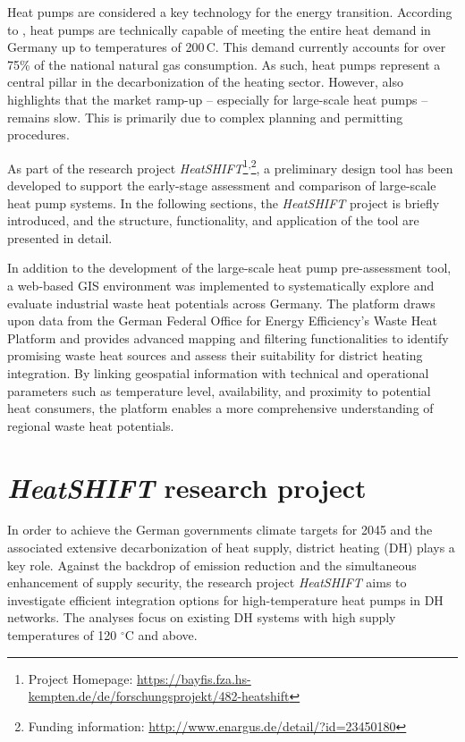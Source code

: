 \documentclass[letterpaper,11pt]{article}
\begin{document}
Heat pumps are considered a key technology for the energy transition. According to \cite{agorarollout}, heat pumps are technically capable of meeting the entire heat demand in Germany up to temperatures of 200\,\textdegree{}C. This demand currently accounts for over 75\% of the national natural gas consumption. As such, heat pumps represent a central pillar in the decarbonization of the heating sector. However, \cite{agorarollout} also highlights that the market ramp-up -- especially for large-scale heat pumps -- remains slow. This is primarily due to complex planning and permitting procedures.

As part of the research project \textit{HeatSHIFT}\footnote{Project Homepage: \url{https://bayfis.fza.hs-kempten.de/de/forschungsprojekt/482-heatshift}}\textsuperscript{,}\footnote{Funding information: \url{http://www.enargus.de/detail/?id=23450180}}, a preliminary design tool has been developed to support the early-stage assessment and comparison of large-scale heat pump systems. In the following sections, the \textit{HeatSHIFT} project is briefly introduced, and the structure, functionality, and application of the tool are presented in detail.

In addition to the development of the large-scale heat pump pre-assessment tool, a web-based GIS environment was implemented to systematically explore and evaluate industrial waste heat potentials across Germany. The platform draws upon data from the German Federal Office for Energy Efficiency’s Waste Heat Platform \cite{bfee_pfa} and provides advanced mapping and filtering functionalities to identify promising waste heat sources and assess their suitability for district heating integration. By linking geospatial information with technical and operational parameters such as temperature level, availability, and proximity to potential heat consumers, the platform enables a more comprehensive understanding of regional waste heat potentials.

\section{\textit{HeatSHIFT} research project}

In order to achieve the German governments climate targets for 2045 and the associated extensive decarbonization of heat supply, district heating (DH) plays a key role. Against the backdrop of emission reduction and the simultaneous enhancement of supply security, the research project \textit{HeatSHIFT} aims to investigate efficient integration options for high-temperature heat pumps in DH networks. The analyses focus on existing DH systems with high supply temperatures of 120 $^\circ$C and above.
\end{document}
